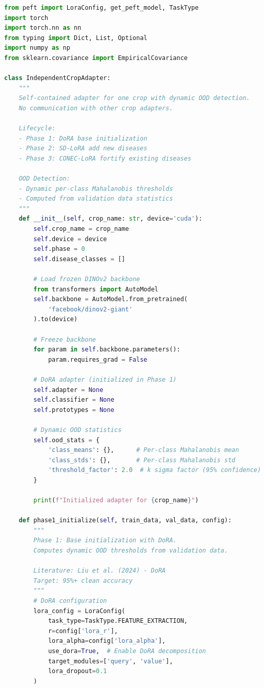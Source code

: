 \documentclass[11pt,a4paper]{article}
\begin{document}
\begin{lstlisting}[language=Python, caption={Independent Crop Adapter Class with Dynamic OOD}]
from peft import LoraConfig, get_peft_model, TaskType
import torch
import torch.nn as nn
from typing import Dict, List, Optional
import numpy as np
from sklearn.covariance import EmpiricalCovariance

class IndependentCropAdapter:
    """
    Self-contained adapter for one crop with dynamic OOD detection.
    No communication with other crop adapters.
    
    Lifecycle:
    - Phase 1: DoRA base initialization
    - Phase 2: SD-LoRA add new diseases
    - Phase 3: CONEC-LoRA fortify existing diseases
    
    OOD Detection:
    - Dynamic per-class Mahalanobis thresholds
    - Computed from validation data statistics
    """
    def __init__(self, crop_name: str, device='cuda'):
        self.crop_name = crop_name
        self.device = device
        self.phase = 0
        self.disease_classes = []
        
        # Load frozen DINOv2 backbone
        from transformers import AutoModel
        self.backbone = AutoModel.from_pretrained(
            'facebook/dinov2-giant'
        ).to(device)
        
        # Freeze backbone
        for param in self.backbone.parameters():
            param.requires_grad = False
        
        # DoRA adapter (initialized in Phase 1)
        self.adapter = None
        self.classifier = None
        self.prototypes = None
        
        # Dynamic OOD statistics
        self.ood_stats = {
            'class_means': {},      # Per-class Mahalanobis mean
            'class_stds': {},       # Per-class Mahalanobis std
            'threshold_factor': 2.0  # k sigma factor (95% confidence)
        }
        
        print(f"Initialized adapter for {crop_name}")
    
    def phase1_initialize(self, train_data, val_data, config):
        """
        Phase 1: Base initialization with DoRA.
        Computes dynamic OOD thresholds from validation data.
        
        Literature: Liu et al. (2024) - DoRA
        Target: 95%+ clean accuracy
        """
        # DoRA configuration
        lora_config = LoraConfig(
            task_type=TaskType.FEATURE_EXTRACTION,
            r=config['lora_r'],
            lora_alpha=config['lora_alpha'],
            use_dora=True,  # Enable DoRA decomposition
            target_modules=['query', 'value'],
            lora_dropout=0.1
        )
        

\end{lstlisting}
\end{document}
